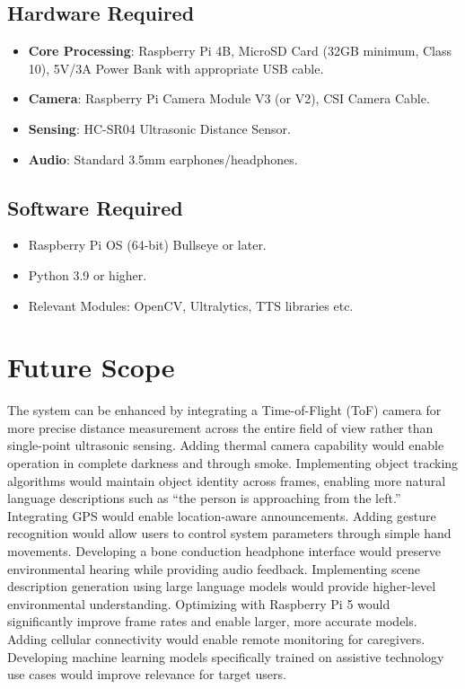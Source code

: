 \documentclass[conference]{IEEEtran}
\begin{document}
\subsection{Hardware Required}
\begin{itemize}
    \item \textbf{Core Processing}: Raspberry Pi 4B, MicroSD Card (32GB minimum, Class 10), 5V/3A Power Bank with appropriate USB cable.
    \item \textbf{Camera}: Raspberry Pi Camera Module V3 (or V2), CSI Camera Cable.
    \item \textbf{Sensing}: HC-SR04 Ultrasonic Distance Sensor.
    \item \textbf{Audio}: Standard 3.5mm earphones/headphones.
\end{itemize}

\subsection{Software Required}
\begin{itemize}
    \item Raspberry Pi OS (64-bit) Bullseye or later.
    \item Python 3.9 or higher.
    \item Relevant Modules: OpenCV, Ultralytics, TTS libraries etc.
\end{itemize}

\section{Future Scope}
The system can be enhanced by integrating a Time-of-Flight (ToF) camera for more precise distance measurement across the entire field of view rather than single-point ultrasonic sensing. Adding thermal camera capability would enable operation in complete darkness and through smoke. Implementing object tracking algorithms would maintain object identity across frames, enabling more natural language descriptions such as ``the person is approaching from the left.'' Integrating GPS would enable location-aware announcements. Adding gesture recognition would allow users to control system parameters through simple hand movements. Developing a bone conduction headphone interface would preserve environmental hearing while providing audio feedback. Implementing scene description generation using large language models would provide higher-level environmental understanding. Optimizing with Raspberry Pi 5 would significantly improve frame rates and enable larger, more accurate models. Adding cellular connectivity would enable remote monitoring for caregivers. Developing machine learning models specifically trained on assistive technology use cases would improve relevance for target users.
\end{document}
